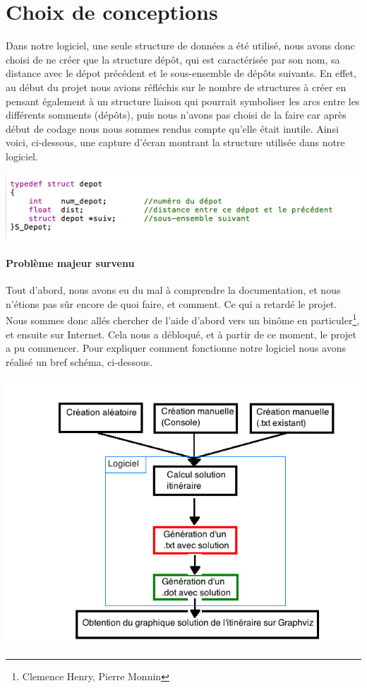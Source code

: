 \documentclass[12pt,a4paper]{report}
\begin{document}
\section{Choix de conceptions}
Dans notre logiciel, une seule structure de données a été utilisé, nous avons donc choisi de ne créer que la structure dépôt, qui est caractérisée par son nom, sa distance avec le dépot précédent et le sous-ensemble de dépôts suivants. En effet, au début du projet nous avions réfléchis sur le nombre de structures à créer en pensant également à un structure liaison qui pourrait symboliser les arcs entre les différents somments (dépôts), puis nous n'avons pas choisi de la faire car après début de codage nous nous sommes rendus compte qu'elle était inutile. Ainsi voici, ci-dessous, une capture d'écran montrant la structure utilisée dans notre logiciel.
\begin{center}
\includegraphics[scale=0.7]{capture2.png}
\end{center} 

\paragraph{Problème majeur survenu}
Tout d'abord, nous avons eu du mal \`{a} comprendre la documentation, et nous n'\'{e}tions pas s\^ur encore de quoi faire, et comment. Ce qui a retard\'{e} le projet. Nous sommes donc all\'{e}s chercher de l'aide d'abord vers un binôme en particuler\footnote{Clemence Henry, Pierre Monnin}, et ensuite sur Internet. Cela nous a d\'{e}bloqu\'{e}, et \`{a} partir de ce moment, le projet a pu commencer.
Pour expliquer comment fonctionne notre logiciel nous avons réalisé un bref schéma, ci-dessous.
\begin{center}
\includegraphics[scale=0.6]{conception.png}
\end{center} 
\end{document}
